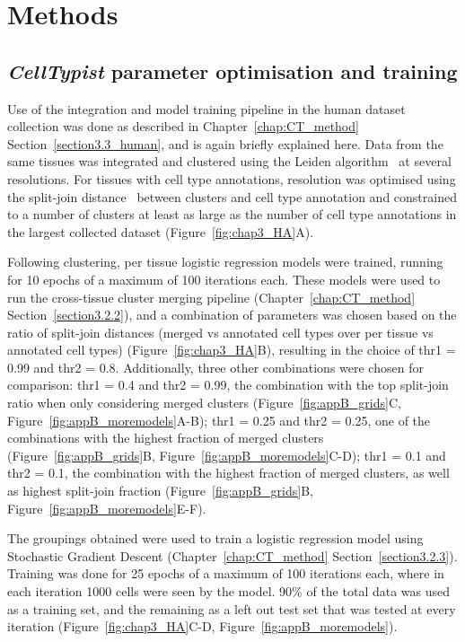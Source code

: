 \section{Methods}
\label{section4.4}
\subsection{\textit{CellTypist} parameter optimisation and training}
\label{section4.4_model}
Use of the integration and model training pipeline in the human dataset collection was done as described in Chapter~\ref{chap:CT_method} Section~\ref{section3.3_human}, and is again briefly explained here. Data from the same tissues was integrated and clustered using the Leiden algorithm~\citep{traag_louvain_2019} at several resolutions. For tissues with cell type annotations, resolution was optimised using the split-join distance~\citep{dongen_performance_2000} between clusters and cell type annotation and constrained to a number of clusters at least as large as the number of cell type annotations in the largest collected dataset (Figure~\ref{fig:chap3_HA}A).

Following clustering, per tissue logistic regression models were trained, running for 10 epochs of a maximum of 100 iterations each. These models were used to run the cross-tissue cluster merging pipeline (Chapter~\ref{chap:CT_method} Section~\ref{section3.2.2}), and a combination of parameters was chosen based on the ratio of split-join distances (merged vs annotated cell types over per tissue vs annotated cell types) (Figure~\ref{fig:chap3_HA}B), resulting in the choice of thr1 = 0.99 and thr2 = 0.8. Additionally, three other combinations were chosen for comparison: thr1 = 0.4 and thr2 = 0.99, the combination with the top split-join ratio when only considering merged clusters (Figure~\ref{fig:appB_grids}C, Figure~\ref{fig:appB_moremodels}A-B); thr1 = 0.25 and thr2 = 0.25, one of the combinations with the highest fraction of merged clusters (Figure~\ref{fig:appB_grids}B, Figure~\ref{fig:appB_moremodels}C-D); thr1 = 0.1 and thr2 = 0.1, the combination with the highest fraction of merged clusters, as well as highest split-join fraction (Figure~\ref{fig:appB_grids}B, Figure~\ref{fig:appB_moremodels}E-F).

The groupings obtained were used to train a logistic regression model using Stochastic Gradient Descent (Chapter~\ref{chap:CT_method} Section~\ref{section3.2.3}). Training was done for 25 epochs of a maximum of 100 iterations each, where in each iteration 1000 cells were seen by the model. 90\% of the total data was used as a training set, and the remaining as a left out test set that was tested at every iteration (Figure~\ref{fig:chap3_HA}C-D, Figure~\ref{fig:appB_moremodels}).


